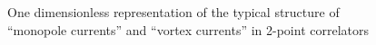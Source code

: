 \documentclass[../main/main.tex]{subfiles}
\begin{document}
\begin{figure}[h]
\begin{tikzpicture}[x=0.75pt,y=0.75pt,yscale=-0.6,xscale=0.6]
\end{tikzpicture}

\caption{One dimensionless representation of the typical structure of ``monopole currents'' and ``vortex currents'' in 2-point correlators}
\label{eq:locality-monopole-vortex}
\end{figure}
\end{document}
